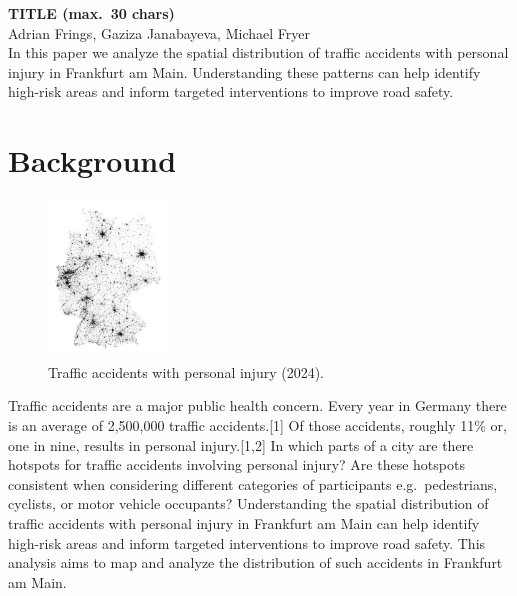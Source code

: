 \documentclass[10pt,a4paper]{article} %
\begin{document}
\begin{center}
    {\large\bfseries TITLE (max.\ 30 chars)}\\[0.5em]
    {\small Adrian Frings, Gaziza Janabayeva, Michael Fryer}\\[1em]
    {\small In this paper we analyze the spatial distribution of traffic accidents with personal injury in Frankfurt am Main. Understanding these patterns can help identify high-risk areas and inform targeted interventions to improve road safety.}
\end{center}


\section*{Background}
\begin{figure}
    \centering
    \vspace{0pt}
    \includegraphics[width=0.28\textwidth]{../src/img/de-2024-bw.png}
    \caption{Traffic accidents with personal injury (2024).}
    \vspace{-50pt}
\end{figure}

Traffic accidents are a major public health concern. Every year in Germany there is an average of 2,500,000 traffic accidents.[1] Of those accidents, roughly 11\% or, one in nine, results in personal injury.[1,2] In which parts of a city are there hotspots for traffic accidents involving personal injury? Are these hotspots consistent when considering different categories of participants e.g.\ pedestrians, cyclists, or motor vehicle occupants? Understanding the spatial distribution of traffic accidents with personal injury in Frankfurt am Main can help identify high-risk areas and inform targeted interventions to improve road safety. This analysis aims to map and analyze the distribution of such accidents in Frankfurt am Main.
\end{document}

